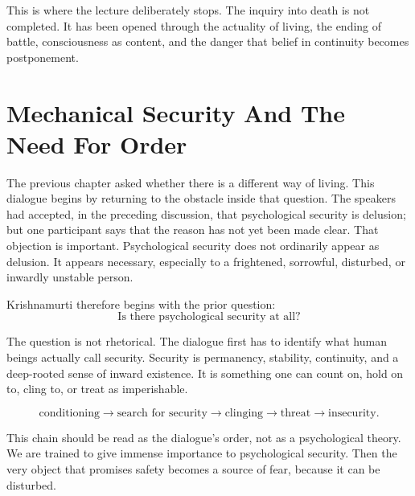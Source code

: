 \documentclass[11pt,oneside]{book}
\begin{document}
This is where the lecture deliberately stops. The inquiry into death is not completed. It has been opened through the actuality of living, the ending of battle, consciousness as content, and the danger that belief in continuity becomes postponement.


\chapter{Mechanical Security And The Need For Order}

The previous chapter asked whether there is a different way of living. This dialogue begins by returning to the obstacle inside that question. The speakers had accepted, in the preceding discussion, that psychological security is delusion; but one participant says that the reason has not yet been made clear. That objection is important. Psychological security does not ordinarily appear as delusion. It appears necessary, especially to a frightened, sorrowful, disturbed, or inwardly unstable person.

Krishnamurti therefore begins with the prior question:
\begin{equation}
\text{Is there psychological security at all?}
\end{equation}

The question is not rhetorical. The dialogue first has to identify what human beings actually call security. Security is permanency, stability, continuity, and a deep-rooted sense of inward existence. It is something one can count on, hold on to, cling to, or treat as imperishable.

\begin{equation}
\text{conditioning}
\longrightarrow
\text{search for security}
\longrightarrow
\text{clinging}
\longrightarrow
\text{threat}
\longrightarrow
\text{insecurity}.
\end{equation}

This chain should be read as the dialogue's order, not as a psychological theory. We are trained to give immense importance to psychological security. Then the very object that promises safety becomes a source of fear, because it can be disturbed.
\end{document}
